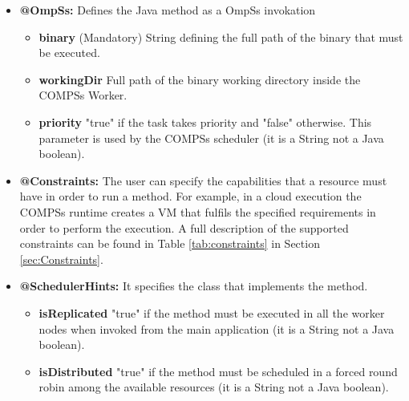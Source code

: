 \begin{itemize}
\begin{itemize}
	\item \textbf{@OmpSs:} Defines the Java method as a OmpSs invokation
	        \begin{itemize}
		        \item \textbf{binary} (Mandatory) String defining the full path of the binary that must be executed.
			\item \textbf{workingDir} Full path of the binary working directory inside the COMPSs Worker.
			\item \textbf{priority} "true" if the task takes priority and "false" otherwise. This parameter is used
			by the COMPSs scheduler (it is a String not a Java boolean).
		\end{itemize}

         \item \textbf{@Constraints:} The user can specify the capabilities that a resource must have in order
               to run a method. For example, in a cloud execution the COMPSs runtime creates a VM that fulfils the
               specified requirements in order to perform the execution. A full description of the supported constraints
               can be found in Table \ref{tab:constraints} in Section \ref{sec:Constraints}.
	 \item \textbf{@SchedulerHints:} It specifies the class that implements the method.
		\begin{itemize}
			\item \textbf{isReplicated} "true" if the method must be executed in all the worker nodes when invoked from 
			the main application (it is a String not a Java boolean).
			\item \textbf{isDistributed} "true" if the method must be scheduled in a forced round robin among the available
			resources (it is a String not a Java boolean).
		\end{itemize}
       \end{itemize}


\end{itemize}
